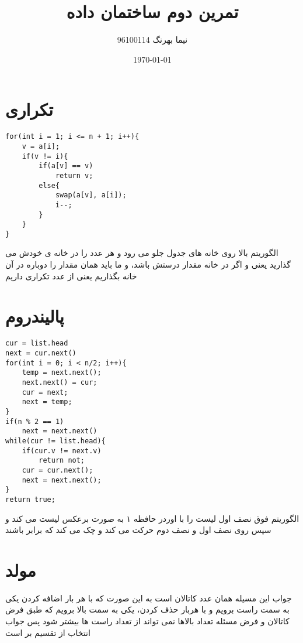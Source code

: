 \documentclass[a4paper]{article}
\title{تمرین دوم ساختمان داده}
\author{نیما بهرنگ 96100114}
\date{\today}
\begin{document}
\maketitle
{}

\section*{تکراری}

\begin{latin}	
\begin{lstlisting}
for(int i = 1; i <= n + 1; i++){
	v = a[i];
	if(v != i){
		if(a[v] == v)
			return v;
		else{
			swap(a[v], a[i]);
			i--;
		}
	}
}
\end{lstlisting}
\end{latin}
الگوریتم بالا روی خانه های جدول جلو می رود و هر عدد را در خانه ی خودش می گذارید یعنی
و اگر در خانه 
مقدار درستش باشد، و ما باید همان مقدار را دوباره در آن خانه بگذاریم یعنی از عدد
تکراری داریم


\newpage
\section*{پالیندروم}
\begin{latin}
\begin{lstlisting}
cur = list.head
next = cur.next()
for(int i = 0; i < n/2; i++){
	temp = next.next();
	next.next() = cur;
	cur = next;
	next = temp;
}
if(n % 2 == 1)
	next = next.next()
while(cur != list.head){
	if(cur.v != next.v)
		return not;
	cur = cur.next();
	next = next.next();
}
return true;
\end{lstlisting}
\end{latin}
الگوریتم فوق نصف اول لیست را با اوردر حافظه ۱ به صورت برعکس لیست می کند و سپس روی نصف اول و نصف دوم حرکت می کند و چک می کند که برابر باشند

\newpage

\section*{مولد}

جواب این مسيله همان عدد کاتالان است به این صورت که با هر بار اضافه کردن یکی به سمت راست برویم و با هربار حذف کردن، یکی به سمت بالا برویم که طبق فرض کاتالان و فرض مسئله تعداد بالاها نمی تواند از تعداد راست ها بیشتر شود
پس جواب انتخاب 
از
تقسیم بر
است
\end{document}
